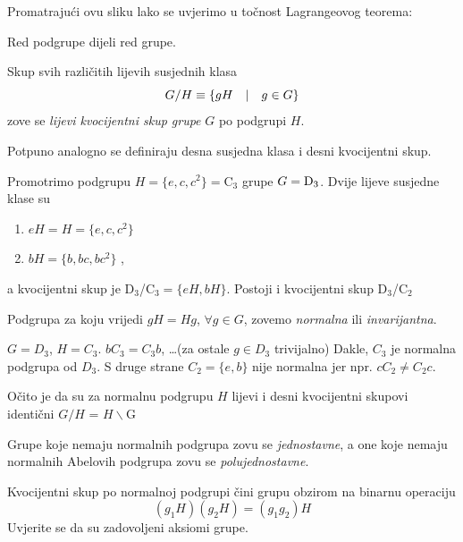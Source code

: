 Promatrajući ovu sliku lako se uvjerimo u točnost Lagrangeovog
teorema:

\begin{teorem}[Lagrange]
Red podgrupe dijeli red grupe.
\end{teorem}

\begin{definicija}
Skup svih različitih lijevih susjednih klasa 
\begin{displaymath}
      G/H \equiv \{gH \quad | \quad g\in G\}
\end{displaymath}
zove se \emph{lijevi kvocijentni skup grupe} $G$ po podgrupi $H$.
\end{definicija}

Potpuno analogno se definiraju desna susjedna klasa i desni kvocijentni
skup.

\begin{primjer}[D$_3$]
Promotrimo podgrupu $H=\{e, c, c^2\}=$C$_3$ grupe $G={\rm D}_3$.
Dvije lijeve susjedne klase su
\begin{enumerate}[1)]
\item $eH=H=\{e, c, c^2\}$ \; 
\item $bH=\{b, bc, bc^2\}$ \;,
\end{enumerate}
a kvocijentni skup je D$_3$/C$_3=\{eH, bH\}$. Postoji i kvocijentni 
skup D$_3$/C$_2$
\end{primjer}

\begin{definicija}
Podgrupa za koju vrijedi $gH=Hg$, $\forall g\in G$, zovemo
\emph{normalna} ili \emph{invarijantna}.
\end{definicija}

\begin{primjer}[D$_3$]
$G=D_3$, $H=C_3$. $bC_3 = C_3 b$, \ldots (za ostale $g\in D_3$ trivijalno)
Dakle, $C_3$  je normalna podgrupa od $D_3$. S druge strane
$C_2 = \{e, b\}$ nije normalna jer npr. $c C_2 \neq C_2 c$.
\end{primjer}

Očito je da su za normalnu podgrupu $H$ lijevi i desni kvocijentni skupovi
identični  $G/H$ = $H\backslash$G

Grupe koje nemaju normalnih podgrupa zovu se \emph{jednostavne},
a one koje nemaju normalnih Abelovih podgrupa zovu se \emph{polujednostavne}.

Kvocijentni skup po normalnoj podgrupi čini grupu obzirom na
binarnu operaciju
\begin{displaymath}
       (g_1H)(g_2H)=(g_1 g_2)H
\end{displaymath}
Uvjerite se da su zadovoljeni aksiomi grupe.


